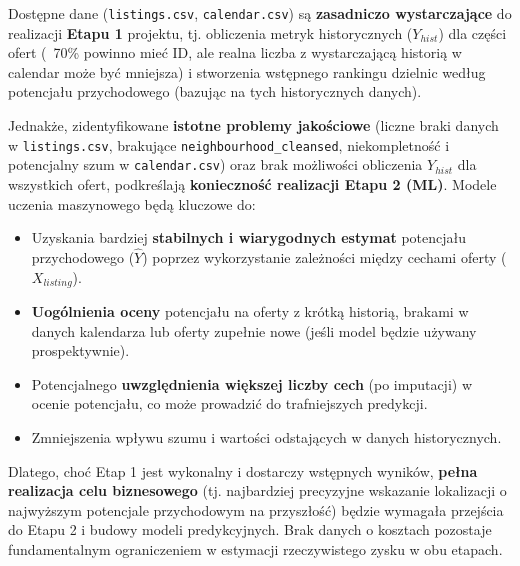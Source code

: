 \documentclass[a4paper,11pt]{article}
\begin{document}
\begin{infobox}
Dostępne dane (\texttt{listings.csv}, \texttt{calendar.csv}) są \textbf{zasadniczo wystarczające} do realizacji \textbf{Etapu 1} projektu, tj. obliczenia metryk historycznych ($Y_{hist}$) dla części ofert (~70\% powinno mieć ID, ale realna liczba z wystarczającą historią w calendar może być mniejsza) i stworzenia wstępnego rankingu dzielnic według potencjału przychodowego (bazując na tych historycznych danych).

Jednakże, zidentyfikowane \textbf{istotne problemy jakościowe} (liczne braki danych w \texttt{listings.csv}, brakujące \texttt{neighbourhood\_cleansed}, niekompletność i potencjalny szum w \texttt{calendar.csv}) oraz brak możliwości obliczenia $Y_{hist}$ dla wszystkich ofert, podkreślają \textbf{konieczność realizacji Etapu 2 (ML)}. Modele uczenia maszynowego będą kluczowe do:
\begin{itemize}
    \item Uzyskania bardziej \textbf{stabilnych i wiarygodnych estymat} potencjału przychodowego ($\widehat{Y}$) poprzez wykorzystanie zależności między cechami oferty ($X_{listing}$).
    \item \textbf{Uogólnienia oceny} potencjału na oferty z krótką historią, brakami w danych kalendarza lub oferty zupełnie nowe (jeśli model będzie używany prospektywnie).
    \item Potencjalnego \textbf{uwzględnienia większej liczby cech} (po imputacji) w ocenie potencjału, co może prowadzić do trafniejszych predykcji.
    \item Zmniejszenia wpływu szumu i wartości odstających w danych historycznych.
\end{itemize}
Dlatego, choć Etap 1 jest wykonalny i dostarczy wstępnych wyników, \textbf{pełna realizacja celu biznesowego} (tj. najbardziej precyzyjne wskazanie lokalizacji o najwyższym potencjale przychodowym na przyszłość) będzie wymagała przejścia do Etapu 2 i budowy modeli predykcyjnych. Brak danych o kosztach pozostaje fundamentalnym ograniczeniem w estymacji rzeczywistego zysku w obu etapach.
\end{infobox}
\end{document}

